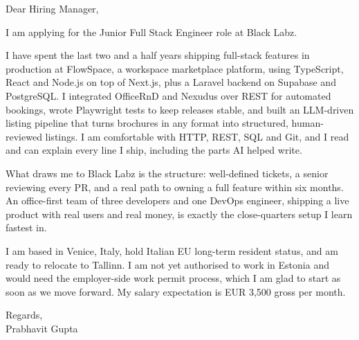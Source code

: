 \documentclass[a4paper,11pt]{article}
\begin{document}
Dear Hiring Manager,

I am applying for the Junior Full Stack Engineer role at Black Labz.

I have spent the last two and a half years shipping full-stack features in production at FlowSpace, a workspace marketplace platform, using TypeScript, React and Node.js on top of Next.js, plus a Laravel backend on Supabase and PostgreSQL. I integrated OfficeRnD and Nexudus over REST for automated bookings, wrote Playwright tests to keep releases stable, and built an LLM-driven listing pipeline that turns brochures in any format into structured, human-reviewed listings. I am comfortable with HTTP, REST, SQL and Git, and I read and can explain every line I ship, including the parts AI helped write.

What draws me to Black Labz is the structure: well-defined tickets, a senior reviewing every PR, and a real path to owning a full feature within six months. An office-first team of three developers and one DevOps engineer, shipping a live product with real users and real money, is exactly the close-quarters setup I learn fastest in.

I am based in Venice, Italy, hold Italian EU long-term resident status, and am ready to relocate to Tallinn. I am not yet authorised to work in Estonia and would need the employer-side work permit process, which I am glad to start as soon as we move forward. My salary expectation is EUR 3,500 gross per month.

Regards,\\
Prabhavit Gupta
\end{document}
